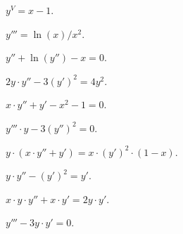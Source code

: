 \begin{problem}
	$y^V = x - 1$.
\end{problem}

\begin{problem}
	$y''' = \ln (x) / x^2$.
\end{problem}

\begin{problem}
	$y'' + \ln (y'') - x = 0$.
\end{problem}

\begin{problem}
	$2 y \cdot y'' - 3 (y')^2 = 4 y^2$.
\end{problem}

\begin{problem}
	$x \cdot y'' + y' - x^2 - 1 = 0$.
\end{problem}

\begin{problem}
	$y''' \cdot y - 3 (y'')^2 = 0$.
\end{problem}

\begin{problem}
	$y \cdot (x \cdot y'' + y') = x \cdot (y')^2 \cdot (1 - x)$.
\end{problem}

\begin{problem}
	$y \cdot y'' - (y')^2 = y'$.
\end{problem}

\begin{problem}
	$x \cdot y \cdot y'' + x \cdot y' = 2 y \cdot y'$.
\end{problem}

\begin{problem}
	$y''' - 3 y \cdot y' = 0$.
\end{problem}
